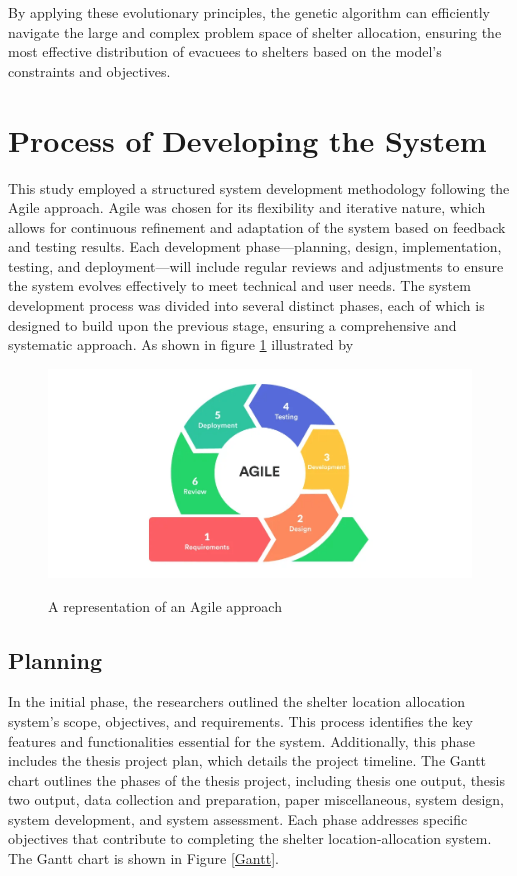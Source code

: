 	By applying these evolutionary principles, the genetic algorithm can efficiently navigate the large and complex problem space of shelter allocation, ensuring the most effective distribution of evacuees to shelters based on the model’s constraints and objectives.
	

	
	
\section{Process of Developing the System}
	This study employed a structured system development methodology following the Agile approach. Agile was chosen for its flexibility and iterative nature, which allows for continuous refinement and adaptation of the system based on feedback and testing results. Each development phase—planning, design, implementation, testing, and deployment—will include regular reviews and adjustments to ensure the system evolves effectively to meet technical and user needs.
	The system development process was divided into several distinct phases, each of which is designed to build upon the previous stage, ensuring a comprehensive and systematic approach. As shown in figure \ref{Agile} illustrated by \textcite{Jayathilaka2020}

	\begin{figure}[h!]
		\caption{A representation of an Agile approach}
		\centering
		\includegraphics[width=\textwidth]{AGILE}
		\label{Agile}
	\end{figure}

\subsection{Planning}

	In the initial phase, the researchers outlined the shelter location allocation system's scope, objectives, and requirements. This process identifies the key features and functionalities essential for the system. Additionally, this phase includes the thesis project plan, which details the project timeline.
	The Gantt chart outlines the phases of the thesis project, including thesis one output, thesis two output, data collection and preparation, paper miscellaneous, system design, system development, and system assessment. Each phase addresses specific objectives that contribute to completing the shelter location-allocation system. The Gantt chart is shown in Figure \ref{Gantt}.
	
